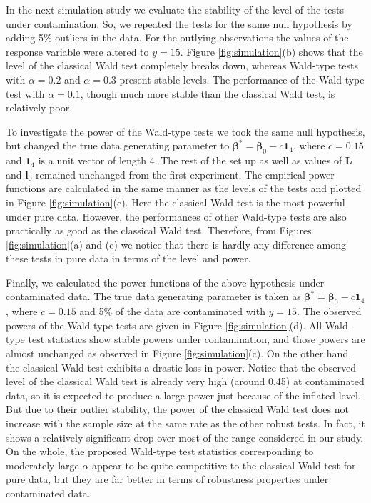 \documentclass[a4paper]{article}%
\begin{document}
In the next simulation study we evaluate the stability of the level of the tests under contamination. So, we
repeated the tests for the same null hypothesis by adding 5\% outliers in the
data. For the outlying observations  the values of the response variable  were altered to $y=15$. Figure \ref{fig:simulation}(b) shows that the level
of the classical Wald test completely breaks down, whereas
Wald-type tests with $\alpha=0.2$ and $\alpha=0.3$ present 
stable levels. The performance of the Wald-type test with $\alpha=0.1$, though much more stable than the classical Wald test, is  relatively poor.

To investigate the power of the Wald-type tests we took the same null hypothesis, 
but changed the true data generating parameter to $\boldsymbol{\beta}^* = \boldsymbol{\beta}_0 - c \boldsymbol{1}_4$, where 
$c = 0.15$ and $\boldsymbol{1}_4$ is a unit vector of length 4. 
The rest of the set up as well as values of $\boldsymbol{L}$ and $\boldsymbol{l}_0$ remained unchanged from the first experiment. The
empirical power functions are calculated in the same manner as the levels of
the tests and plotted in Figure \ref{fig:simulation}(c). Here the classical Wald test is the
most powerful under pure data. However, the performances of other Wald-type tests are also practically as  good as the classical Wald test. Therefore, from Figures \ref{fig:simulation}(a) and (c) we notice that there is hardly any difference among these tests in pure data in terms of the level and power.  


Finally, we calculated the power functions of the above
hypothesis  under contaminated data. The true data generating parameter is taken as $\boldsymbol{\beta}^* = \boldsymbol{\beta}_0 - c \boldsymbol{1}_4$, where 
$c = 0.15$ and 5\% of the data are contaminated with $y=15$. The observed
powers of the Wald-type tests are given in Figure \ref{fig:simulation}(d). All
Wald-type test statistics  show stable powers
under contamination, and those powers are almost unchanged as observed in Figure \ref{fig:simulation}(c). On the other hand, the classical Wald test exhibits a drastic loss in power. Notice that the
observed level of the classical Wald test is already very high (around 0.45) at contaminated data, so it is expected to produce a large power just because of the inflated level. But due to their outlier stability, the power of the classical Wald test does not increase with the sample size  at the same rate as the other robust tests. In fact, it shows a relatively significant drop over most of the range considered in our study.   On the whole, the proposed Wald-type test statistics corresponding to
moderately large $\alpha$ appear to be quite competitive to the classical
Wald test for pure data, but they are far better in terms of robustness
properties under contaminated data.
\end{document}
